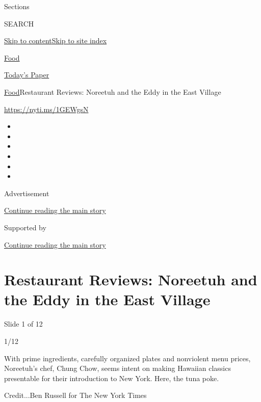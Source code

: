 Sections

SEARCH

\protect\hyperlink{site-content}{Skip to
content}\protect\hyperlink{site-index}{Skip to site index}

\href{https://www.nytimes3xbfgragh.onion/section/food}{Food}

\href{https://myaccount.nytimes3xbfgragh.onion/auth/login?response_type=cookie\&client_id=vi}{}

\href{https://www.nytimes3xbfgragh.onion/section/todayspaper}{Today's
Paper}

\href{/section/food}{Food}\textbar{}Restaurant Reviews: Noreetuh and the
Eddy in the East Village

\url{https://nyti.ms/1GEWgsN}

\begin{itemize}
\item
\item
\item
\item
\item
\item
\end{itemize}

Advertisement

\protect\hyperlink{after-top}{Continue reading the main story}

Supported by

\protect\hyperlink{after-sponsor}{Continue reading the main story}

\hypertarget{restaurant-reviews-noreetuh-and-the-eddy-in-the-east-village}{%
\section{Restaurant Reviews: Noreetuh and the Eddy in the East
Village}\label{restaurant-reviews-noreetuh-and-the-eddy-in-the-east-village}}

Slide 1 of 12

1/12

With prime ingredients, carefully organized plates and nonviolent menu
prices, Noreetuh's chef, Chung Chow, seems intent on making Hawaiian
classics presentable for their introduction to New York. Here, the tuna
poke.

Credit...Ben Russell for The New York Times

